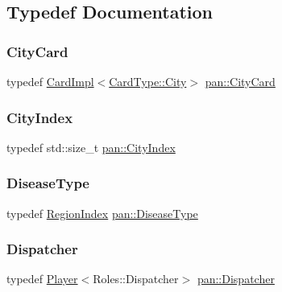 \subsection{Typedef Documentation}
\mbox{\label{namespacepan_ae049a214a793815ae007f571e9e96b1c}} 
\subsubsection{\texorpdfstring{City\+Card}{CityCard}}
{\footnotesize\ttfamily typedef \hyperlink{classpan_1_1_card_impl}{Card\+Impl}$<$\hyperlink{namespacepan_a1f7350bfd0421afeabe9fa95c16fa811a57d056ed0984166336b7879c2af3657f}{Card\+Type\+::\+City}$>$ \hyperlink{namespacepan_ae049a214a793815ae007f571e9e96b1c}{pan\+::\+City\+Card}}

\mbox{\label{namespacepan_afaed28aa6603153dcc062a028602d697}} 
\subsubsection{\texorpdfstring{City\+Index}{CityIndex}}
{\footnotesize\ttfamily typedef std\+::size\+\_\+t \hyperlink{namespacepan_afaed28aa6603153dcc062a028602d697}{pan\+::\+City\+Index}}

\mbox{\label{namespacepan_a48851b51b0aef3f0e1be80df5031d9d7}} 
\subsubsection{\texorpdfstring{Disease\+Type}{DiseaseType}}
{\footnotesize\ttfamily typedef \hyperlink{namespacepan_a648dcc32a76222a9e4cd4a3e80bda642}{Region\+Index} \hyperlink{namespacepan_a48851b51b0aef3f0e1be80df5031d9d7}{pan\+::\+Disease\+Type}}

\mbox{\label{namespacepan_ab83794c5a8984145e9229aa6b173d270}} 
\subsubsection{\texorpdfstring{Dispatcher}{Dispatcher}}
{\footnotesize\ttfamily typedef \hyperlink{classpan_1_1_player}{Player}$<$Roles\+::\+Dispatcher$>$ \hyperlink{namespacepan_ab83794c5a8984145e9229aa6b173d270}{pan\+::\+Dispatcher}}

